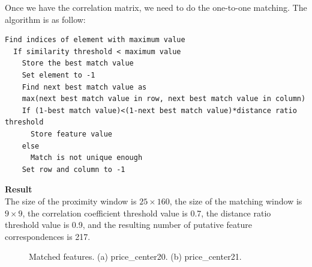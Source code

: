 \documentclass{../../assignment}
\begin{document}
\begin{problemlist}
\begin{enumerate}
Once we have the correlation matrix, we need to do the one-to-one matching. The algorithm is as follow:
\begin{lstlisting}
Find indices of element with maximum value
  If similarity threshold < maximum value
    Store the best match value
    Set element to -1
    Find next best match value as
    max(next best match value in row, next best match value in column)    
    If (1-best match value)<(1-next best match value)*distance ratio threshold
      Store feature value
    else
      Match is not unique enough    
    Set row and column to -1
\end{lstlisting}


\textbf{Result}\\
The size of the proximity window is $25\times160$, the size of the matching window is $9\times9$, the correlation coefficient threshold value is 0.7, the distance ratio threshold value is 0.9, and the resulting number of putative feature correspondences is 217.\\
\begin{figure}[H]
\caption{Matched features. (a) price\_center20. (b) price\_center21.}
\label{fig:images}
\end{figure} 


\end{enumerate}
\end{problemlist}
\end{document}

